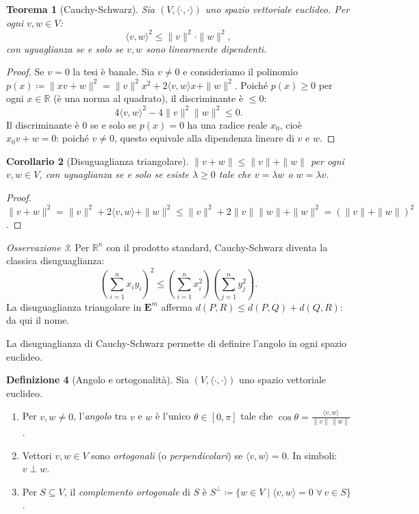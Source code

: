 \documentclass[11pt, a4paper]{book}
\theoremstyle{definition}
\newtheorem{definizione}{Definizione}[section]
\theoremstyle{plain}
\newtheorem{teorema}[definizione]{Teorema}
\newtheorem{corollario}[definizione]{Corollario}
\theoremstyle{remark}
\newtheorem{osservazione}[definizione]{Osservazione}
\newcommand{\R}{\mathbb{R}}
\begin{document}
\begin{teorema}[Cauchy-Schwarz]
\label{thm:cauchy-schwarz}
Sia $(V,\langle\cdot,\cdot\rangle)$ uno spazio vettoriale euclideo. Per ogni $v,w \in V$:
\[
  \langle v,w\rangle^2 \leq \|v\|^2 \cdot \|w\|^2,
\]
con uguaglianza se e solo se $v,w$ sono linearmente dipendenti.
\end{teorema}

\begin{proof}
Se $v=0$ la tesi è banale. Sia $v \neq 0$ e consideriamo il polinomio $p(x) \coloneqq \|xv+w\|^2 = \|v\|^2 x^2 + 2\langle v,w\rangle x + \|w\|^2$. Poiché $p(x) \geq 0$ per ogni $x \in \R$ (è una norma al quadrato), il discriminante è $\leq 0$:
\[
  4\langle v,w\rangle^2 - 4\|v\|^2\|w\|^2 \leq 0.
\]
Il discriminante è $0$ se e solo se $p(x)=0$ ha una radice reale $x_0$, cioè $x_0 v + w = 0$: poiché $v \neq 0$, questo equivale alla dipendenza lineare di $v$ e $w$.
\end{proof}

\begin{corollario}[Disuguaglianza triangolare]
\label{cor:triangolare}
$\|v+w\| \leq \|v\| + \|w\|$ per ogni $v,w \in V$, con uguaglianza se e solo se esiste $\lambda \geq 0$ tale che $v = \lambda w$ o $w = \lambda v$.
\end{corollario}

\begin{proof}
$\|v+w\|^2 = \|v\|^2 + 2\langle v,w\rangle + \|w\|^2 \leq \|v\|^2 + 2\|v\|\|w\| + \|w\|^2 = (\|v\|+\|w\|)^2$.
\end{proof}

\begin{osservazione}
Per $\R^n$ con il prodotto standard, Cauchy-Schwarz diventa la classica disuguaglianza:
\[
  \left(\sum_{i=1}^n x_i y_i\right)^2 \leq \left(\sum_{i=1}^n x_i^2\right)\left(\sum_{j=1}^n y_j^2\right).
\]
La disuguaglianza triangolare in $\mathbf{E}^m$ afferma $d(P,R) \leq d(P,Q) + d(Q,R)$: da qui il nome.
\end{osservazione}

La disuguaglianza di Cauchy-Schwarz permette di definire l'angolo in ogni spazio euclideo.

\begin{defbox}
\begin{definizione}[Angolo e ortogonalità]
\label{def:angolo}
Sia $(V,\langle\cdot,\cdot\rangle)$ uno spazio vettoriale euclideo.
\begin{enumerate}
  \item Per $v,w \neq 0$, l'\emph{angolo} tra $v$ e $w$ è l'unico $\theta \in [0,\pi]$ tale che
  $\displaystyle\cos\theta = \frac{\langle v,w\rangle}{\|v\|\,\|w\|}$.
  \item Vettori $v,w \in V$ sono \emph{ortogonali} (o \emph{perpendicolari}) se $\langle v,w\rangle = 0$. In simboli: $v \perp w$.
  \item Per $S \subseteq V$, il \emph{complemento ortogonale} di $S$ è $S^\perp \coloneqq \{w \in V \mid \langle v,w\rangle = 0\;\forall\,v \in S\}$.
\end{enumerate}
\end{definizione}
\end{defbox}
\end{document}
